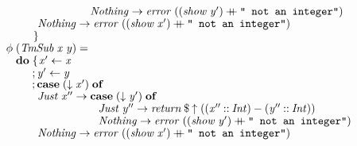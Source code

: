 \documentclass[10pt]{article}
\newcommand{\Conid}[1]{\mathit{#1}}
\newcommand{\Varid}[1]{\mathit{#1}}
\newcommand{\plus}{\mathbin{+\!\!\!+}}
\begin{document}
\begin{tabbing}
${\hskip1.00em\relax\hskip2.00em\relax\phantom{\Varid{\phi}\;\mbox{}}\phantom{\mathbf{do}\;\mbox{}}\phantom{;\mbox{}}\phantom{\Conid{Just}\;\Varid{x''}\to \mbox{}}\Conid{Nothing}\to \Varid{error}\;((\Varid{show}\;\Varid{y'})\plus \text{\tt \char34 ~not~an~integer\char34})}$\\
${\hskip1.00em\relax\hskip2.00em\relax\phantom{\Varid{\phi}\;\mbox{}}\phantom{\mathbf{do}\;\mbox{}}\phantom{;\mbox{}}\Conid{Nothing}\to \Varid{error}\;((\Varid{show}\;\Varid{x'})\plus \text{\tt \char34 ~not~an~integer\char34})}$\\
${\hskip1.00em\relax\hskip2.00em\relax\phantom{\Varid{\phi}\;\mbox{}}\phantom{\mathbf{do}\;\mbox{}}\mskip1.5mu\}}$\\
${}$\\
${\hskip1.00em\relax\hskip2.00em\relax\Varid{\phi}\;(\Conid{TmSub}\;\Varid{x}\;\Varid{y})\mathrel{=}}$\\
${\hskip1.00em\relax\hskip2.00em\relax\phantom{\Varid{\phi}\;\mbox{}}\mathbf{do}\;\{\mskip1.5mu \Varid{x'}\leftarrow \Varid{x}}$\\
${\hskip1.00em\relax\hskip2.00em\relax\phantom{\Varid{\phi}\;\mbox{}}\phantom{\mathbf{do}\;\mbox{}};\Varid{y'}\leftarrow \Varid{y}}$\\
${\hskip1.00em\relax\hskip2.00em\relax\phantom{\Varid{\phi}\;\mbox{}}\phantom{\mathbf{do}\;\mbox{}};\mathbf{case}\;(\Varid{\downarrow}\;\Varid{x'})\;\mathbf{of}}$\\
${\hskip1.00em\relax\hskip2.00em\relax\phantom{\Varid{\phi}\;\mbox{}}\phantom{\mathbf{do}\;\mbox{}}\phantom{;\mbox{}}\Conid{Just}\;\Varid{x''}\to \mathbf{case}\;(\Varid{\downarrow}\;\Varid{y'})\;\mathbf{of}}$\\
${\hskip1.00em\relax\hskip2.00em\relax\phantom{\Varid{\phi}\;\mbox{}}\phantom{\mathbf{do}\;\mbox{}}\phantom{;\mbox{}}\hskip5.50em\relax\Conid{Just}\;\Varid{y''}\to \Varid{return}\mathbin{\$}\Varid{\uparrow}\;((\Varid{x''}\mathbin{::}\Conid{Int})\mathbin{-}(\Varid{y''}\mathbin{::}\Conid{Int}))}$\\
${\hskip1.00em\relax\hskip2.00em\relax\phantom{\Varid{\phi}\;\mbox{}}\phantom{\mathbf{do}\;\mbox{}}\phantom{;\mbox{}}\hskip5.50em\relax\Conid{Nothing}\to \Varid{error}\;((\Varid{show}\;\Varid{y'})\plus \text{\tt \char34 ~not~an~integer\char34})}$\\
${\hskip1.00em\relax\hskip2.00em\relax\phantom{\Varid{\phi}\;\mbox{}}\phantom{\mathbf{do}\;\mbox{}}\phantom{;\mbox{}}\Conid{Nothing}\to \Varid{error}\;((\Varid{show}\;\Varid{x'})\plus \text{\tt \char34 ~not~an~integer\char34})}$\\

\end{tabbing}
\end{document}
